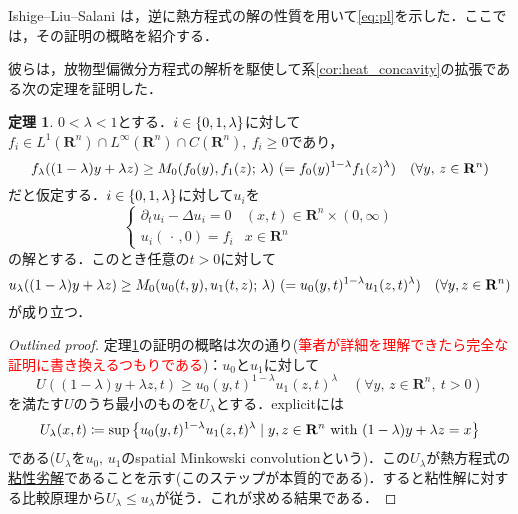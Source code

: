 \documentclass[a4j]{ltjsarticle}
\newcommand{\Rset}{\mathbf{R}}
\newcommand{\1}{\bm{1}}
\newcommand{\M}[4]{M_{#1}\qty(#2,#3;\,#4)}
\numberwithin{equation}{section}
\theoremstyle{definition}
\newtheorem{thm}{定理}[section]
\begin{document}
Ishige--Liu--Salani \cite{ILS}は，逆に熱方程式の解の性質を用いて\eqref{eq:pl}を示した．ここでは，その証明の概略を紹介する．

彼らは，放物型偏微分方程式の解析を駆使して系\ref{cor:heat_concavity}の拡張である次の定理を証明した．
\begin{thm}\label{thm:conc_preserve}
    $0<\lambda<1$とする．$i\in\qty{0,1,\lambda}$に対して$f_i\in L^1(\Rset^n)\cap L^\infty(\Rset^n)\cap C(\Rset^n),\ f_i\geq0$であり，
    \begin{equation}
        f_\lambda((1-\lambda)y+\lambda z)\geq \M{0}{f_0(y)}{f_1(z)}{\lambda}\ (=f_0(y)^{1-\lambda}f_1(z)^{\lambda})\quad (\forall y,\,z\in\Rset^n)\label{eq:conc_preserve_assump}
    \end{equation}
    だと仮定する．$i\in\qty{0,1,\lambda}$に対して$u_i$を
    \begin{equation}
        \left\{
        \begin{array}{rl}
            \partial_{t}u_i-\Delta u_i=0 & (x,t)\in\Rset^n\times (0,\infty)\\
            u_i(\,\cdot\,,0)=f_i & x\in\Rset^n
        \end{array}
        \right.
    \end{equation}
    の解とする．このとき任意の$t>0$に対して
    \begin{equation}
        u_\lambda((1-\lambda)y+\lambda z)\geq \M{0}{u_0(t,y)}{u_1(t,z)}{\lambda}\ (=u_{0}(y,t)^{1-\lambda}u_{1}(z,t)^{\lambda})\quad (\forall y,z\in\Rset^n)
    \end{equation}
    が成り立つ．
\end{thm}
\begin{proof}[Outlined proof]
    定理\ref{thm:conc_preserve}の証明の概略は次の通り(\textcolor{red}{筆者が詳細を理解できたら完全な証明に書き換えるつもりである})：$u_0$と$u_1$に対して
    \begin{equation}
        U((1-\lambda)y+\lambda z,t)\geq u_0(y,t)^{1-\lambda}u_1(z,t)^{\lambda}\quad (\forall y,\,z\in \Rset^n,\ t>0)
    \end{equation}
    を満たす$U$のうち最小のものを$U_{\lambda}$とする．explicitには
    \begin{equation}
        U_{\lambda}(x,t)\coloneqq \sup\qty{u_{0}(y,t)^{1-\lambda}u_1(z,t)^{\lambda}\mid y,z\in\Rset^n\ \text{with}\ (1-\lambda)y+\lambda z=x}
    \end{equation}
    である($U_{\lambda}$を$u_0,\,u_1$のspatial Minkowski convolutionという)．この$U_{\lambda}$が熱方程式の\underline{粘性劣解}であることを示す(このステップが本質的である)．すると粘性解に対する比較原理から$U_{\lambda}\leq u_{\lambda}$が従う．これが求める結果である．
\end{proof}
\end{document}
